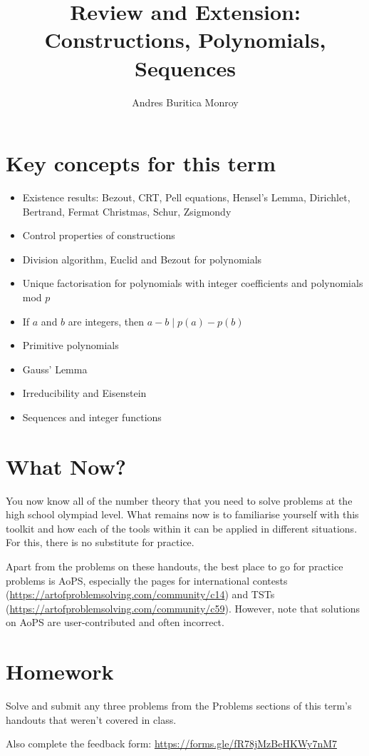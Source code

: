 \documentclass{article}
\title{Review and Extension: Constructions, Polynomials, Sequences}
\author{Andres Buritica Monroy}
\date{}
\begin{document}
\maketitle
\section{Key concepts for this term}
\begin{itemize}
	\item Existence results: Bezout, CRT, Pell equations, Hensel's
	      Lemma, Dirichlet, Bertrand, Fermat Christmas, Schur, Zsigmondy
	\item Control properties of constructions
	\item Division algorithm, Euclid and Bezout for polynomials
	\item Unique factorisation for polynomials with integer coefficients and
	      polynomials mod $p$
	\item If $a$ and $b$ are integers, then $a-b\mid p(a)-p(b)$
	\item Primitive polynomials
	\item Gauss' Lemma
	\item Irreducibility and Eisenstein
	\item Sequences and integer functions
\end{itemize}
\section{What Now?}
You now know all of the number theory that you need to solve problems
at the high school olympiad level. What remains now
is to familiarise yourself with this toolkit and how each of the tools within it
can be applied in different situations. For this, there is no substitute for
practice.

Apart from the problems on these handouts, the best place to go for
practice problems is AoPS, especially
the pages for international contests
(\url{https://artofproblemsolving.com/community/c14})
and TSTs (\url{https://artofproblemsolving.com/community/c59}).
However, note that solutions on AoPS are user-contributed and often incorrect.
\section{Homework}
Solve and submit any three problems from the Problems sections of this term’s handouts that
weren’t covered in class.

Also complete the feedback form: \url{https://forms.gle/fR78jMzBeHKWy7nM7}
\end{document}
